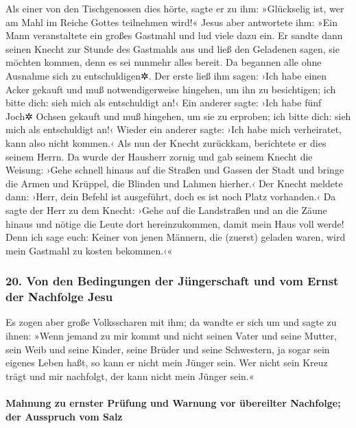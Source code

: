  Als einer von den Tischgenossen dies hörte, sagte er zu
ihm: »Glückselig ist, wer am Mahl im Reiche Gottes teilnehmen wird!«
 Jesus aber antwortete ihm: »Ein Mann veranstaltete ein
großes Gastmahl und lud viele dazu ein.  Er sandte dann
seinen Knecht zur Stunde des Gastmahls aus und ließ den Geladenen sagen,
sie möchten kommen, denn es sei nunmehr alles bereit.  Da
begannen alle ohne Ausnahme sich zu entschuldigen✲. Der erste ließ ihm
sagen: ›Ich habe einen Acker gekauft und muß notwendigerweise hingehen,
um ihn zu besichtigen; ich bitte dich: sieh mich als entschuldigt an!‹
 Ein anderer sagte: ›Ich habe fünf Joch✲ Ochsen gekauft
und muß hingehen, um sie zu erproben; ich bitte dich: sieh mich als
entschuldigt an!‹  Wieder ein anderer sagte: ›Ich habe
mich verheiratet, kann also nicht kommen.‹  Als nun der
Knecht zurückkam, berichtete er dies seinem Herrn. Da wurde der Hausherr
zornig und gab seinem Knecht die Weisung: ›Gehe schnell hinaus auf die
Straßen und Gassen der Stadt und bringe die Armen und Krüppel, die
Blinden und Lahmen hierher.‹  Der Knecht meldete dann:
›Herr, dein Befehl ist ausgeführt, doch es ist noch Platz vorhanden.‹
 Da sagte der Herr zu dem Knecht: ›Gehe auf die
Landstraßen und an die Zäune hinaus und nötige die Leute dort
hereinzukommen, damit mein Haus voll werde!  Denn ich
sage euch: Keiner von jenen Männern, die (zuerst) geladen waren, wird
mein Gastmahl zu kosten bekommen.‹«

\hypertarget{von-den-bedingungen-der-juxfcngerschaft-und-vom-ernst-der-nachfolge-jesu}{%
\subsubsection{20. Von den Bedingungen der Jüngerschaft und vom Ernst
der Nachfolge
Jesu}\label{von-den-bedingungen-der-juxfcngerschaft-und-vom-ernst-der-nachfolge-jesu}}

 Es zogen aber große Volksscharen mit ihm; da wandte er
sich um und sagte zu ihnen:  »Wenn jemand zu mir kommt
und nicht seinen Vater und seine Mutter, sein Weib und seine Kinder,
seine Brüder und seine Schwestern, ja sogar sein eigenes Leben haßt, so
kann er nicht mein Jünger sein.  Wer nicht sein Kreuz
trägt und mir nachfolgt, der kann nicht mein Jünger sein.«

\hypertarget{mahnung-zu-ernster-pruxfcfung-und-warnung-vor-uxfcbereilter-nachfolge-der-ausspruch-vom-salz}{%
\paragraph{Mahnung zu ernster Prüfung und Warnung vor übereilter
Nachfolge; der Ausspruch vom
Salz}\label{mahnung-zu-ernster-pruxfcfung-und-warnung-vor-uxfcbereilter-nachfolge-der-ausspruch-vom-salz}}

